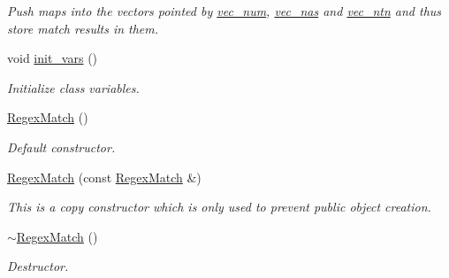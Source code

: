 \begin{DoxyCompactItemize}
\begin{DoxyCompactList}\small\item\em Push maps into the vectors pointed by \hyperlink{classjpcre2_1_1RegexMatch_a836705e0444568c78abaab4c8e351335}{vec\+\_\+num}, \hyperlink{classjpcre2_1_1RegexMatch_a812b57dc08fdc0caa93a1b508ef8242c}{vec\+\_\+nas} and \hyperlink{classjpcre2_1_1RegexMatch_a86ef413ab6d237972af858be26ff77f7}{vec\+\_\+ntn} and thus store match results in them. \end{DoxyCompactList}\item 
void \hyperlink{classjpcre2_1_1RegexMatch_a3da6a2319cd577d7f2f10c66dcf59a99}{init\+\_\+vars} ()
\begin{DoxyCompactList}\small\item\em Initialize class variables. \end{DoxyCompactList}\item 
\hyperlink{classjpcre2_1_1RegexMatch_a40127e5057e2343848d8c8a6d4c32bcd}{Regex\+Match} ()
\begin{DoxyCompactList}\small\item\em Default constructor. \end{DoxyCompactList}\item 
\hyperlink{classjpcre2_1_1RegexMatch_a098ddb46b2f297870ea548ef07597d94}{Regex\+Match} (const \hyperlink{classjpcre2_1_1RegexMatch}{Regex\+Match} \&)
\begin{DoxyCompactList}\small\item\em This is a copy constructor which is only used to prevent public object creation. \end{DoxyCompactList}\item 
\hyperlink{classjpcre2_1_1RegexMatch_ab6a9f9b8404852e46edd08a5b8712847}{$\sim$\+Regex\+Match} ()
\begin{DoxyCompactList}\small\item\em Destructor. \end{DoxyCompactList}\end{DoxyCompactItemize}
